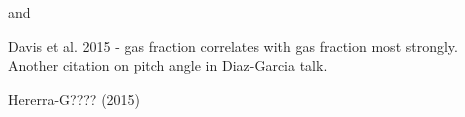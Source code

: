 


and \citet{EFIGI}

Davis et al. 2015 - gas fraction correlates with gas fraction most strongly.
Another citation on pitch angle in Diaz-Garcia talk. 

Hererra-G???? (2015)